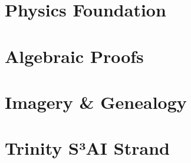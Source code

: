 \documentclass[12pt,a4paper,openany,oneside]{book}
\providecommand{\printbibliography}{}
\theoremstyle{definition}
\theoremstyle{remark}
\begin{document}
\part{Physics Foundation}






\part{Algebraic Proofs}






\part{Imagery \& Genealogy}





\part{Trinity S³AI Strand}




































\appendix















\printbibliography
\end{document}
